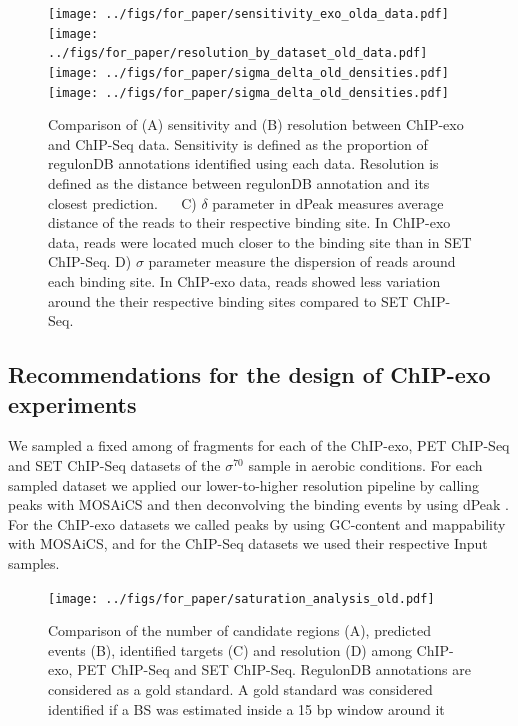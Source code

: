 \documentclass{bmcart}\usepackage[]{graphicx}\usepackage[]{color}
\begin{document}
\begin{figure}[h!]
  \centering
  \texttt{[image: ../figs/for\_paper/sensitivity\_exo\_olda\_data.pdf]}
  \texttt{[image: ../figs/for\_paper/resolution\_by\_dataset\_old\_data.pdf]}
   \texttt{[image: ../figs/for\_paper/sigma\_delta\_old\_densities.pdf]}
   \texttt{[image: ../figs/for\_paper/sigma\_delta\_old\_densities.pdf]} 

   \caption{Comparison of (A) sensitivity and (B) resolution between
     ChIP-exo and ChIP-Seq data. Sensitivity is defined as the
     proportion of regulonDB annotations identified using each
     data. Resolution is defined as the distance between regulonDB
     annotation and its closest prediction. $\quad$ C) $\delta$ parameter in
     dPeak measures average distance of the reads to their respective
     binding site. In ChIP-exo data, reads were located much closer to
     the binding site than in SET ChIP-Seq. D) $\sigma$ parameter
     measure the dispersion of reads around each binding site. In
     ChIP-exo data, reads showed less variation around the their
     respective binding sites compared to SET ChIP-Seq.}
  \label{fig:reso_all}
\end{figure}

\subsection{Recommendations for the design of ChIP-exo experiments}
\label{sec:reco}




We sampled a fixed among of fragments for each of the ChIP-exo, PET
ChIP-Seq and SET ChIP-Seq datasets of the $\sigma^{70}$ sample in
aerobic conditions. For each sampled dataset we applied our
lower-to-higher resolution pipeline by calling peaks with MOSAiCS
\cite{mosaics} and then deconvolving the binding events by using dPeak
\cite{dpeak}. For the ChIP-exo datasets we called peaks by using
GC-content and mappability with MOSAiCS, and for the ChIP-Seq datasets
we used their respective Input samples.

\begin{figure}[h!]
  \centering
  \texttt{[image: ../figs/for\_paper/saturation\_analysis\_old.pdf]}
  \caption{Comparison of the number of candidate regions (A),
    predicted events (B), identified targets (C) and resolution (D)
    among ChIP-exo, PET ChIP-Seq and SET ChIP-Seq. RegulonDB
    annotations are considered as a gold standard. A gold standard was
    considered identified if a BS was estimated inside a 15
    bp window around it}
  \label{fig:design}
\end{figure}
\end{document}
